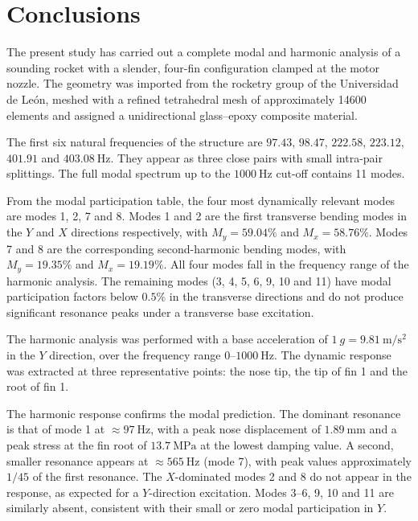 \section{Conclusions}

The present study has carried out a complete modal and harmonic analysis of a sounding rocket with a slender, four-fin configuration clamped at the motor nozzle. The geometry was imported from the rocketry group of the Universidad de Le\'on, meshed with a refined tetrahedral mesh of approximately \num{14600} elements and assigned a unidirectional glass--epoxy composite material.

The first six natural frequencies of the structure are $\num{97.43}$, $\num{98.47}$, $\num{222.58}$, $\num{223.12}$, $\num{401.91}$ and $\num{403.08}\ \si{\hertz}$. They appear as three close pairs with small intra-pair splittings. The full modal spectrum up to the $\SI{1000}{\hertz}$ cut-off contains \num{11} modes.

From the modal participation table, the four most dynamically relevant modes are modes 1, 2, 7 and 8. Modes 1 and 2 are the first transverse bending modes in the $Y$ and $X$ directions respectively, with $M_y = 59.04\%$ and $M_x = 58.76\%$. Modes 7 and 8 are the corresponding second-harmonic bending modes, with $M_y = 19.35\%$ and $M_x = 19.19\%$. All four modes fall in the frequency range of the harmonic analysis. The remaining modes (3, 4, 5, 6, 9, 10 and 11) have modal participation factors below $0.5\%$ in the transverse directions and do not produce significant resonance peaks under a transverse base excitation.

The harmonic analysis was performed with a base acceleration of $\SI{1}{g} = \SI{9.81}{\metre\per\second\squared}$ in the $Y$ direction, over the frequency range $\num{0}$--$\num{1000}\ \si{\hertz}$. The dynamic response was extracted at three representative points: the nose tip, the tip of fin 1 and the root of fin 1.

The harmonic response confirms the modal prediction. The dominant resonance is that of mode 1 at $\approx \SI{97}{\hertz}$, with a peak nose displacement of $\SI{1.89}{\milli\metre}$ and a peak stress at the fin root of $\SI{13.7}{\mega\pascal}$ at the lowest damping value. A second, smaller resonance appears at $\approx \SI{565}{\hertz}$ (mode 7), with peak values approximately $1/45$ of the first resonance. The $X$-dominated modes 2 and 8 do not appear in the response, as expected for a $Y$-direction excitation. Modes 3--6, 9, 10 and 11 are similarly absent, consistent with their small or zero modal participation in $Y$.

